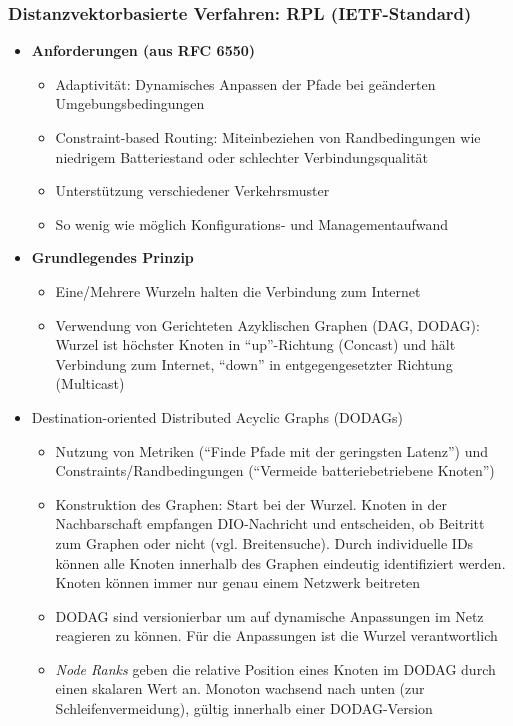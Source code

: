 \subsubsection{Distanzvektorbasierte Verfahren: RPL (IETF-Standard)}
\begin{itemize}
	\item \textbf{Anforderungen (aus RFC 6550)}
	\begin{itemize}
		\item Adaptivität: Dynamisches Anpassen der Pfade bei geänderten Umgebungsbedingungen
		\item Constraint-based Routing: Miteinbeziehen von Randbedingungen wie niedrigem Batteriestand oder schlechter Verbindungsqualität
		\item Unterstützung verschiedener Verkehrsmuster
		\item So wenig wie möglich Konfigurations- und Managementaufwand
	\end{itemize}
	\item \textbf{Grundlegendes Prinzip}
	\begin{itemize}
		\item Eine/Mehrere Wurzeln halten die Verbindung zum Internet
		\item Verwendung von Gerichteten Azyklischen Graphen (DAG, DODAG): Wurzel ist höchster Knoten in "`up"'-Richtung (Concast) und hält Verbindung zum Internet, "`down"' in entgegengesetzter Richtung (Multicast)
	\end{itemize}
	\item Destination-oriented Distributed Acyclic Graphs (DODAGs)
	\begin{itemize}
		\item Nutzung von Metriken ("`Finde Pfade mit der geringsten Latenz"') und Constraints/Randbedingungen ("`Vermeide batteriebetriebene Knoten"')
		\item Konstruktion des Graphen: Start bei der Wurzel. Knoten in der Nachbarschaft empfangen DIO-Nachricht und entscheiden, ob Beitritt zum Graphen oder nicht (vgl. Breitensuche). Durch individuelle IDs können alle Knoten innerhalb des Graphen eindeutig identifiziert werden. Knoten können immer nur genau einem Netzwerk beitreten
		\item DODAG sind versionierbar um auf dynamische Anpassungen im Netz reagieren zu können. Für die Anpassungen ist die Wurzel verantwortlich
		\item \textit{Node Ranks} geben die relative Position eines Knoten im DODAG durch einen skalaren Wert an. Monoton wachsend nach unten (zur Schleifenvermeidung), gültig innerhalb einer DODAG-Version

\end{itemize}
\end{itemize}

